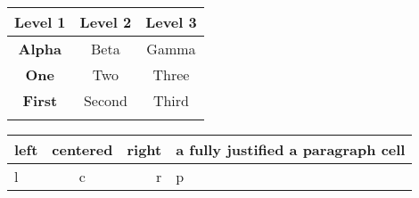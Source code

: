 
\begin{tabular}{ccc}
    \hline
    \bfseries Level 1 & Level 2 & Level 3\\
    \hline
    \bfseries Alpha & Beta & Gamma\\
    \bfseries One & Two & Three\\
    \bfseries First & Second & Third\\
    \hline \\
\end{tabular}

\begin{tabular}{|l|c|r|p{1.7cm}|}
    \hline
    left & centered & right & a fully justified a paragraph cell\\
    \hline
    l & c & r & p\\
    \hline 
\end{tabular}
